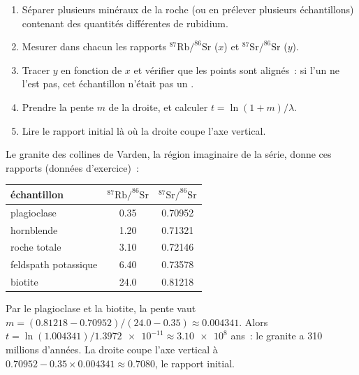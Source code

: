 \begin{method}\label{met:g12:age-of-the-earth:isochron}
\begin{enumerate}
  \item Séparer plusieurs minéraux de la roche (ou en prélever plusieurs
        échantillons) contenant des quantités différentes de rubidium.
  \item Mesurer dans chacun les rapports $^{87}\mathrm{Rb}/^{86}\mathrm{Sr}$
        ($x$) et $^{87}\mathrm{Sr}/^{86}\mathrm{Sr}$ ($y$).
  \item Tracer $y$ en fonction de $x$ et vérifier que les points sont
        alignés~: si l'un ne l'est pas, cet échantillon n'était pas un
        .
  \item Prendre la pente $m$ de la droite, et calculer $t = \ln(1+m)/\lambda$.
  \item Lire le rapport initial là où la droite coupe l'axe vertical.
\end{enumerate}
\end{method}

\begin{example}\label{ex:g12:age-of-the-earth:varden}
Le granite des collines de Varden, la région imaginaire de la série, donne
ces rapports (données d'exercice)~:
\begin{center}
\small
\begin{tabular}{|l|c|c|}
\hline
échantillon & $^{87}\mathrm{Rb}/^{86}\mathrm{Sr}$ & $^{87}\mathrm{Sr}/^{86}\mathrm{Sr}$ \\
\hline
plagioclase & 0.35 & 0.70952 \\
hornblende  & 1.20 & 0.71321 \\
roche totale & 3.10 & 0.72146 \\
feldspath potassique & 6.40 & 0.73578 \\
biotite     & 24.0 & 0.81218 \\
\hline
\end{tabular}
\end{center}
Par le plagioclase et la biotite, la pente vaut
$m = (0.81218 - 0.70952)/(24.0 - 0.35) \approx 0.004341$. Alors
$t = \ln(1.004341)/\num{1.3972e-11} \approx \num{3.10e8}$ ans~: le granite
a 310 millions d'années. La droite coupe l'axe vertical à
$0.70952 - 0.35 \times 0.004341 \approx 0.7080$, le rapport initial.
\end{example}

